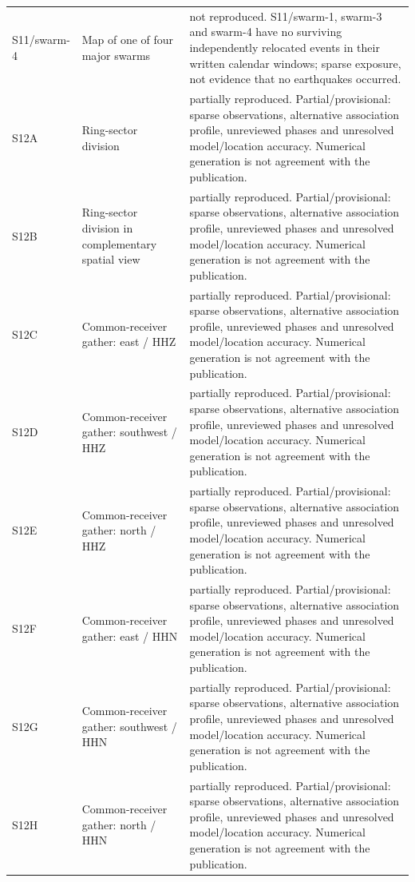 \begin{longtable}{>{\raggedright\arraybackslash}p{.13\linewidth}>{\raggedright\arraybackslash}p{.28\linewidth}>{\raggedright\arraybackslash}p{.49\linewidth}}
S11/\allowbreak{}swarm-4 & Map of one of four major swarms & not reproduced. S11/swarm-1, swarm-3 and swarm-4 have no surviving independently relocated events in their written calendar windows; sparse exposure, not evidence that no earthquakes occurred.\\[3pt]
S12A & Ring-sector division & partially reproduced. Partial/provisional: sparse observations, alternative association profile, unreviewed phases and unresolved model/location accuracy. Numerical generation is not agreement with the publication.\\[3pt]
S12B & Ring-sector division in complementary spatial view & partially reproduced. Partial/provisional: sparse observations, alternative association profile, unreviewed phases and unresolved model/location accuracy. Numerical generation is not agreement with the publication.\\[3pt]
S12C & Common-receiver gather: east /\allowbreak{} HHZ & partially reproduced. Partial/provisional: sparse observations, alternative association profile, unreviewed phases and unresolved model/location accuracy. Numerical generation is not agreement with the publication.\\[3pt]
S12D & Common-receiver gather: southwest /\allowbreak{} HHZ & partially reproduced. Partial/provisional: sparse observations, alternative association profile, unreviewed phases and unresolved model/location accuracy. Numerical generation is not agreement with the publication.\\[3pt]
S12E & Common-receiver gather: north /\allowbreak{} HHZ & partially reproduced. Partial/provisional: sparse observations, alternative association profile, unreviewed phases and unresolved model/location accuracy. Numerical generation is not agreement with the publication.\\[3pt]
S12F & Common-receiver gather: east /\allowbreak{} HHN & partially reproduced. Partial/provisional: sparse observations, alternative association profile, unreviewed phases and unresolved model/location accuracy. Numerical generation is not agreement with the publication.\\[3pt]
S12G & Common-receiver gather: southwest /\allowbreak{} HHN & partially reproduced. Partial/provisional: sparse observations, alternative association profile, unreviewed phases and unresolved model/location accuracy. Numerical generation is not agreement with the publication.\\[3pt]
S12H & Common-receiver gather: north /\allowbreak{} HHN & partially reproduced. Partial/provisional: sparse observations, alternative association profile, unreviewed phases and unresolved model/location accuracy. Numerical generation is not agreement with the publication.\\[3pt]

\end{longtable}
